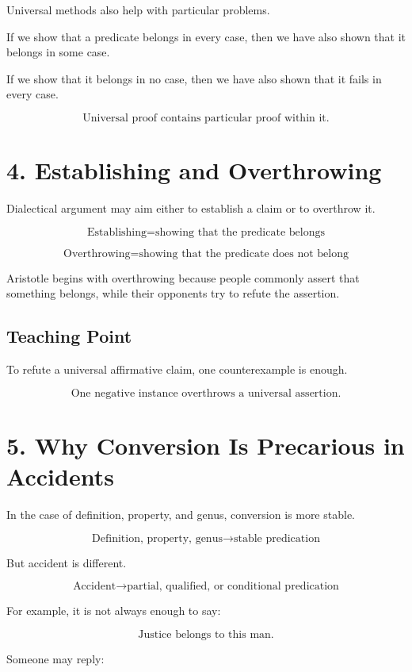 \documentclass[12pt]{article}
\begin{document}
Universal methods also help with particular problems.

If we show that a predicate belongs in every case, then we have also shown that
it belongs in some case.

If we show that it belongs in no case, then we have also shown that it fails in
every case.

\[
\boxed{
\text{Universal proof contains particular proof within it.}
}
\]

\section*{4. Establishing and Overthrowing}

Dialectical argument may aim either to establish a claim or to overthrow it.

\[
\text{Establishing} = \text{showing that the predicate belongs}
\]

\[
\text{Overthrowing} = \text{showing that the predicate does not belong}
\]

Aristotle begins with overthrowing because people commonly assert that
something belongs, while their opponents try to refute the assertion.

\subsection*{Teaching Point}

To refute a universal affirmative claim, one counterexample is enough.

\[
\boxed{
\text{One negative instance overthrows a universal assertion.}
}
\]

\section*{5. Why Conversion Is Precarious in Accidents}

In the case of definition, property, and genus, conversion is more stable.

\[
\text{Definition, property, genus} \rightarrow \text{stable predication}
\]

But accident is different.

\[
\text{Accident} \rightarrow \text{partial, qualified, or conditional predication}
\]

For example, it is not always enough to say:

\[
\text{Justice belongs to this man.}
\]

Someone may reply:
\end{document}
